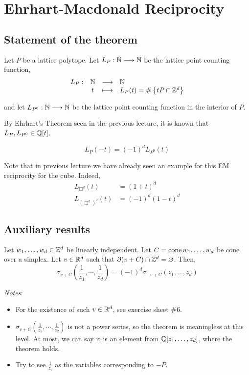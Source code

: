 \chapter{Ehrhart-Macdonald Reciprocity}


\section{Statement of the theorem}

Let $P$ be a lattice polytope. Let $L_P:\mathbb{N}\longrightarrow\mathbb{N}$ be the lattice point counting function,
\[\begin{array}{cccl}
  L_P: &\mathbb{N} &\longrightarrow &\mathbb{N} \\
  &t &\longmapsto &L_P(t)=\#\left\{tP\cap\mathbb{Z}^d\right\}
\end{array}\]

and let $L_{P^0}:\mathbb{N}\longrightarrow\mathbb{N}$ be the lattice point counting function in the interior of $P$.

By Ehrhart's Theorem seen in the previous lecture, it is known that $L_P, L_{P^0}\in\mathbb{Q}[t]$.

\begin{theorem}
\[
  L_P(-t) = (-1)^d L_{P^0}(t)
\]
\end{theorem}

Note that in previous lecture we have already seen an example for this EM reciprocity for the cube. Indeed,
\begin{align*}
  L_{\Box^d}(t) &= (1+t)^d\\
  L_{(\Box^d)^0}(t) &= (-1)^d(1-t)^d
\end{align*}

\bigskip
\section{Auxiliary results}

\begin{proposition}
  Let $w_1,\ldots,w_d\in\mathbb{Z}^d$ be linearly independent. Let $C=\operatorname{cone}{w_1,\ldots,w_d}$ be cone over a simplex. Let $v\in\mathbb{R}^d$ such that $\partial(v+C)\cap \mathbb{Z}^d=\varnothing$. Then,
  \[
    \sigma_{v+C}\left(\frac{1}{z_1},\cdots,\frac{1}{z_d}\right) = (-1)^d \sigma_{-v+C}(z_1,\ldots,z_d)
  \]
\end{proposition}

\emph{Notes}:
\begin{itemize}
 \item For the existence of such $v\in\mathbb{R}^d$, see exercise sheet \#6.
 \item $\sigma_{v+C}\left(\frac{1}{z_1},\cdots,\frac{1}{z_d}\right)$ is not a power series, so the theorem is meaningless at this level. At most, we can say it is an element from $\mathbb{Q}[z_1,\ldots,z_d]$, where the theorem holds.
 \item Try to see $\frac{1}{z_i}$ as the variables corresponding to $-P$.
\end{itemize}


